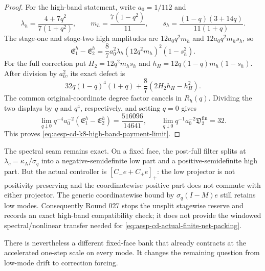 \begin{proof}
For the high-band statement, write $a_0=1/112$ and
\begin{equation*}
 \lambda_h=\frac{4+7q^2}{7(1+q^2)},
 \qquad
 m_h=\frac{7(1-q^2)}{11},
 \qquad
 s_h=\frac{(1-q)(3+14q)}{11(1+q)}.
\end{equation*}
The stage-one and stage-two high amplitudes are
$12a_0q^2m_h$ and $12a_0q^2m_hs_h$, so
\begin{equation*}
 \mathfrak E_1^h-\mathfrak E_2^h
 =\frac87a_0^2\lambda_h(12q^2m_h)^2(1-s_h^2).
\end{equation*}
For the full correction put
$H_2=12q^2m_hs_h$ and
$h_H=12q(1-q)m_h(1-s_h)$.  After division by $a_0^2$, its exact defect is
\begin{equation*}
 32q(1-q)^4(1+q)+\frac87(2H_2h_H-h_H^2).
\end{equation*}
The common original-coordinate degree factor cancels in $R_h(q)$.  Dividing
the two displays by $q$ and $q^4$, respectively, and setting $q=0$ gives
\begin{equation*}
 \lim_{q\downarrow0}q^{-4}a_0^{-2}
   (\mathfrak E_1^h-\mathfrak E_2^h)
 =\frac{516096}{14641},
 \qquad
 \lim_{q\downarrow0}q^{-1}a_0^{-2}
   \mathfrak D_2^{\mathrm{fin}}=32.
\end{equation*}
This proves \cref{eq:aesp-cd-k8-high-band-payment-limit}.
\end{proof}

The spectral seam remains exact.  On a fixed face, the post-full filter splits
at $\lambda_c=\kappa_{\mathrm A}/\sigma_q$ into a negative-semidefinite low
part and a positive-semidefinite high part.  But the actual controller is
$[C_-e+C_+e]_+$: the low projector is not positivity preserving and the
coordinatewise positive part does not commute with either projector.  The
generic coordinatewise bound by $\sigma_q(I-M)e$ still retains low modes.
Consequently Round 027 stops the unsplit stagewise reserve and records an
exact high-band compatibility check; it does not provide the windowed
spectral/nonlinear transfer needed for \cref{eq:aesp-cd-actual-finite-net-packing}.

There is nevertheless a different fixed-face bank that already contracts at
the accelerated one-step scale on every mode.  It changes the remaining
question from low-mode drift to correction forcing.


